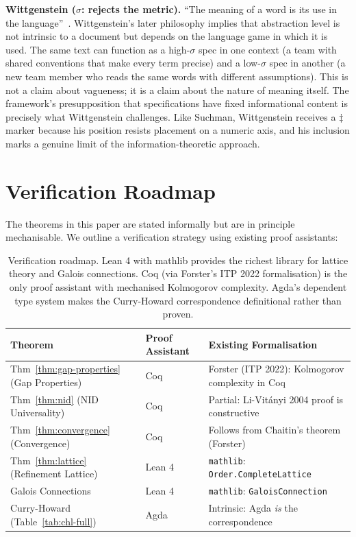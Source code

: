 \documentclass[11pt, a4paper, copyright]{googledeepmind}
\begin{document}
\textbf{Wittgenstein ($\sigma$: rejects the metric).} ``The meaning of a word is its use in the language''~\citep{wittgenstein1953philosophical}. Wittgenstein's later philosophy implies that abstraction level is not intrinsic to a document but depends on the language game in which it is used. The same text can function as a high-$\sigma$ spec in one context (a team with shared conventions that make every term precise) and a low-$\sigma$ spec in another (a new team member who reads the same words with different assumptions). This is not a claim about vagueness; it is a claim about the nature of meaning itself. The framework's presupposition that specifications have fixed informational content is precisely what Wittgenstein challenges. Like Suchman, Wittgenstein receives a $\ddagger$ marker because his position resists placement on a numeric axis, and his inclusion marks a genuine limit of the information-theoretic approach.


\section{Verification Roadmap}
\label{app:verification}

The theorems in this paper are stated informally but are in principle mechanisable. We outline a verification strategy using existing proof assistants:

\begin{table}[H]
\centering
\small
\begin{tabular}{lll}
\toprule
\textbf{Theorem} & \textbf{Proof Assistant} & \textbf{Existing Formalisation} \\
\midrule
Thm~\ref{thm:gap-properties} (Gap Properties) & Coq & Forster (ITP 2022): Kolmogorov complexity in Coq \\
Thm~\ref{thm:nid} (NID Universality) & Coq & Partial: Li-Vit\'{a}nyi 2004 proof is constructive \\
Thm~\ref{thm:convergence} (Convergence) & Coq & Follows from Chaitin's theorem (Forster) \\
Thm~\ref{thm:lattice} (Refinement Lattice) & Lean 4 & \texttt{mathlib}: \texttt{Order.CompleteLattice} \\
Galois Connections & Lean 4 & \texttt{mathlib}: \texttt{GaloisConnection} \\
Curry-Howard (Table~\ref{tab:chl-full}) & Agda & Intrinsic: Agda \emph{is} the correspondence \\
\bottomrule
\end{tabular}
\caption{Verification roadmap. Lean 4 with mathlib provides the richest library for lattice theory and Galois connections. Coq (via Forster's ITP 2022 formalisation) is the only proof assistant with mechanised Kolmogorov complexity. Agda's dependent type system makes the Curry-Howard correspondence definitional rather than proven.}
\label{tab:verification}
\end{table}
\end{document}
